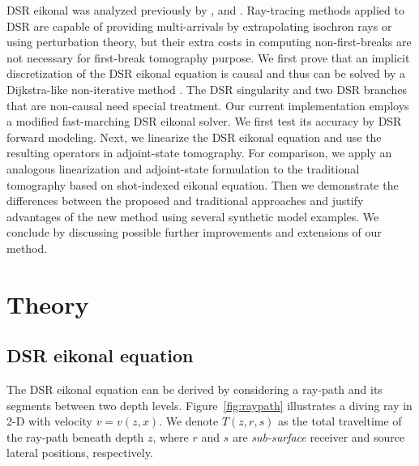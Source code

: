 DSR eikonal was analyzed previously by \cite{belonosova}, \cite{duchkov} and \cite{tariq}. Ray-tracing methods 
applied to DSR are capable of providing multi-arrivals by extrapolating isochron rays \cite[]{iversen} or using 
perturbation theory, but their extra costs in computing non-first-breaks are not necessary for first-break 
tomography purpose. We first prove that an implicit discretization of the DSR eikonal equation is causal 
and thus can be solved by a Dijkstra-like non-iterative method \cite[]{dijkstra}. The DSR singularity and two DSR 
branches that are non-causal need special treatment. Our current implementation 
employs a modified fast-marching \cite[]{sethian} DSR eikonal 
solver. We first test its accuracy by DSR forward modeling. Next, we linearize the DSR 
eikonal equation and use the resulting operators in adjoint-state tomography. For comparison, we apply an 
analogous linearization and adjoint-state formulation to the traditional tomography based on shot-indexed eikonal 
equation. Then we demonstrate the differences between the proposed and traditional approaches and 
justify advantages of the new method using several synthetic model examples. We conclude by discussing possible 
further improvements and extensions of our method.

\section{Theory}
\subsection{DSR eikonal equation}

The DSR eikonal equation can be derived by considering a ray-path and its segments between two depth levels. 
Figure~\ref{fig:raypath} illustrates a diving ray \cite[]{zhu} in 2-D with velocity $v = v (z,x)$. We denote 
$T (z,r,s)$ as the total traveltime of the ray-path beneath depth $z$, where $r$ and $s$ are \textit{sub-surface} 
receiver and source lateral positions, respectively. 

